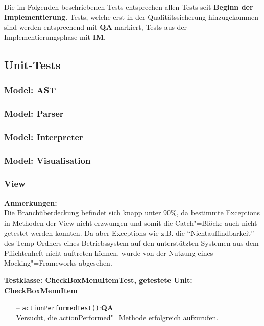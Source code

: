 \documentclass[parskip=full,11pt,twoside]{scrartcl}
\def\qa{\hfill\textbf{QA}}
\begin{document}
Die im Folgenden beschriebenen Tests entsprechen allen Tests seit \textbf{Beginn der Implementierung}. Tests, welche erst in der Qualitätssicherung hinzugekommen sind werden entsprechend mit \textbf{QA} markiert, Tests aus der Implementierungsphase mit \textbf{IM}.

\subsection{Unit-Tests}

\subsubsection{Model: AST}
\subsubsection{Model: Parser}
\subsubsection{Model: Interpreter}
\subsubsection{Model: Visualisation}
\subsubsection{View}
\textbf{Anmerkungen:}\\
Die Branchüberdeckung befindet sich knapp unter 90\%, da bestimmte Exceptions in Methoden der View nicht erzwungen und somit die Catch"=Blöcke auch nicht getestet werden konnten. Da aber Exceptions wie z.B. die \enquote{Nichtauffindbarkeit} des Temp-Ordners eines Betriebssystem auf den unterstützten Systemen aus dem Pflichtenheft nicht auftreten können, wurde von der Nutzung eines Mocking"=Frameworks abgesehen.

\textbf{Testklasse: CheckBoxMenuItemTest, getestete Unit: CheckBoxMenuItem}
\begin{itemize}
	\item[--] \texttt{actionPerformedTest()}:\qa\\
	Versucht, die actionPerformed"=Methode erfolgreich aufzurufen.
\end{itemize}
\end{document}
